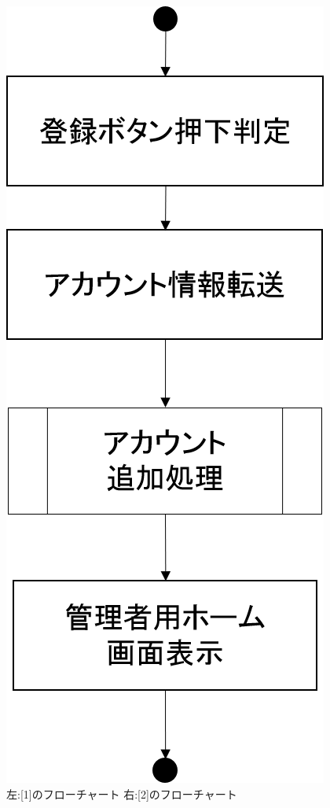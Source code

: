 \begin{figure}[htbp]
\begin{minipage}{0.5\hsize}
\begin{center}
   \includegraphics[width=1\linewidth,clip]{./img/admin_create_account/sub2.png}
  \end{center}
 \end{minipage}
 \caption{左:[1]のフローチャート 右:[2]のフローチャート}\label{fig:admincreateaccountflow0}
\end{figure}

